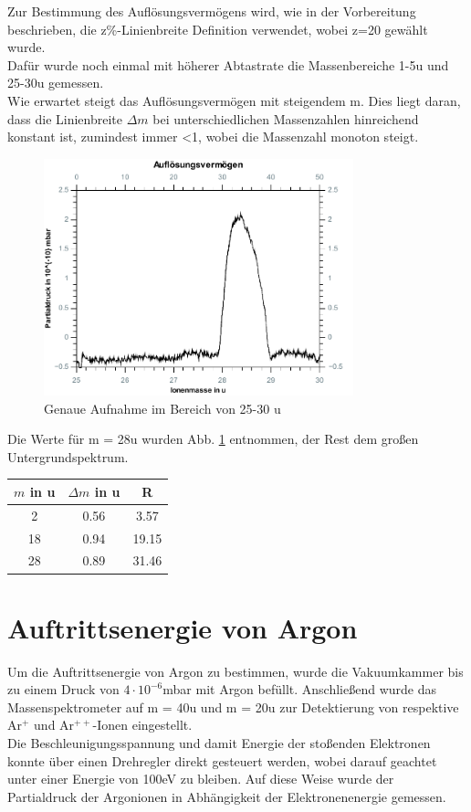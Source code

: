 Zur Bestimmung des Auflösungsvermögens wird, wie in der Vorbereitung beschrieben, die z\%-Linienbreite Definition verwendet, wobei z=20 gewählt wurde.\\
Dafür wurde noch einmal mit höherer Abtastrate die Massenbereiche 1-5\;u und 25-30\;u gemessen.\\
Wie erwartet steigt das Auflösungsvermögen mit steigendem m. Dies liegt daran, dass die Linienbreite $\Delta m$ bei unterschiedlichen Massenzahlen hinreichend konstant ist, zumindest immer <1, wobei die Massenzahl monoton steigt.\\
\begin{figure}[h]
	\centering\includegraphics[width=0.8\textwidth]{fig/aufloesung}
	\caption{Genaue Aufnahme im Bereich von 25-30 u}
	\label{fig:aufloesung}
\end{figure}
Die Werte für m = 28\;u wurden Abb. \ref{fig:aufloesung} entnommen, der Rest dem großen Untergrundspektrum.
\begin{tabular}{ccc}
	\toprule
	$m$ in u&$\Delta m$ in u&R\\
	\midrule
	2&0.56&3.57\\
	18&0.94&19.15\\
	28&0.89&31.46\\
	\bottomrule
\end{tabular}

\section{Auftrittsenergie von Argon}

Um die Auftrittsenergie von Argon zu bestimmen, wurde die Vakuumkammer bis zu einem Druck von $4\cdot 10^{-6}$\;mbar mit Argon befüllt.
Anschließend wurde das Massenspektrometer auf m = 40\;u und m = 20\;u zur Detektierung von respektive Ar$^{+}$ und Ar$^{++}$-Ionen eingestellt.\\
Die Beschleunigungsspannung und damit Energie der stoßenden Elektronen konnte über einen Drehregler direkt gesteuert werden, wobei darauf geachtet unter einer Energie von 100\;eV zu bleiben.
Auf diese Weise wurde der Partialdruck der Argonionen in Abhängigkeit der Elektronenenergie gemessen.

